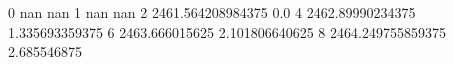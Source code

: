 0 nan nan
1 nan nan
2 2461.564208984375 0.0
4 2462.89990234375 1.335693359375
6 2463.666015625 2.101806640625
8 2464.249755859375 2.685546875
